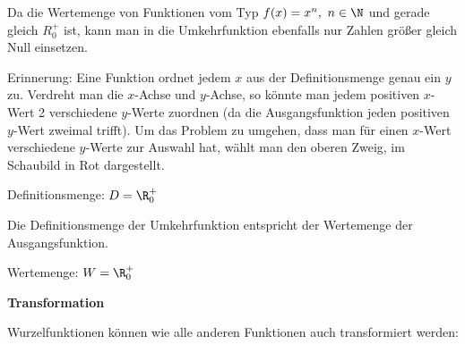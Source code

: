 \textcolor{loes}{Da die Wertemenge von Funktionen vom Typ \(f(x)=x^n,\ n\in\N\) und gerade gleich \(R^+_0\) ist, kann man in die Umkehrfunktion ebenfalls nur Zahlen größer gleich Null einsetzen.}

\textcolor{loes}{Erinnerung: Eine Funktion ordnet jedem \(x\) aus der Definitionsmenge genau ein \(y\) zu. Verdreht man die \(x\)-Achse und \(y\)-Achse, so könnte man jedem positiven \(x\)-Wert 2 verschiedene \(y\)-Werte zuordnen (da die Ausgangsfunktion jeden positiven \(y\)-Wert zweimal trifft). Um das Problem zu umgehen, dass man für einen \(x\)-Wert verschiedene \(y\)-Werte zur Auswahl hat, wählt man den oberen Zweig, im Schaubild in Rot dargestellt.}

\hspace{1cm}

Definitionsmenge: \textcolor{loes}{\(D=\R^+_0\)}

\textcolor{loes}{Die Definitionsmenge der Umkehrfunktion entspricht der Wertemenge der Ausgangsfunktion.}

\hspace{1cm}

Wertemenge: \textcolor{loes}{\(W=\R^+_0\)}

\textbf{Transformation}

Wurzelfunktionen können wie alle anderen Funktionen auch transformiert werden:

\bigskip 

\begin{minipage}{\textwidth}	
\end{minipage}

\bigskip

